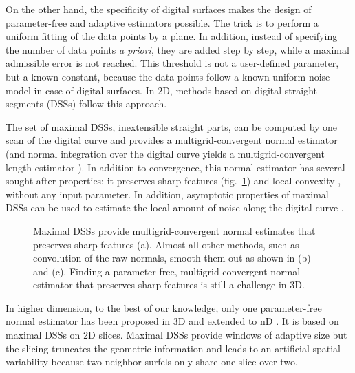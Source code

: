 On the other hand, the specificity of digital surfaces makes the design of parameter-free
and adaptive estimators possible. The trick is to perform a uniform fitting of the data points by a plane.
In addition, instead of specifying the number of data points \emph{a priori}, they are added
step by step, while a maximal admissible error is not reached. This threshold is not a user-defined
parameter, but a known constant, because the data points follow a known uniform noise model
in case of digital surfaces. In 2D, methods based on digital straight segments (DSSs) follow
this approach.

The set of maximal DSSs, \ie inextensible straight parts, can be computed by one scan of the
digital curve \cite{Feschet1999,Feschet2005} and provides a multigrid-convergent
normal estimator \cite{Lachaud2007} (and normal integration over the digital curve yields
a multigrid-convergent length estimator \cite{Coeurjolly2004}). In addition to
convergence, this normal estimator has several sought-after properties:
it preserves sharp features (fig.~\ref{fig:corner}) and local convexity \cite{Roussillon2011},
without any input parameter. 
In addition, asymptotic properties of maximal DSSs can be used to estimate the local amount
of noise along the digital curve \cite{Kerautret2012}.  
\begin{figure}[htbp]
  \centering
  \caption{Maximal DSSs provide multigrid-convergent normal estimates that preserves sharp features (a). 
    Almost all other methods, such as convolution of the raw normals, smooth them out as shown in (b) and (c).
    Finding a parameter-free, multigrid-convergent normal estimator that preserves sharp features is still a
    challenge in 3D.}
  \label{fig:corner}
\end{figure}

In higher dimension, to the best of our knowledge, only one parameter-free normal estimator
has been proposed in 3D \cite{Lenoir1996,Tellier1999} and extended to nD \cite{Lachaud2003}.
It is based on maximal DSSs on 2D slices. Maximal DSSs provide windows of adaptive size
but the slicing truncates the geometric information and leads to
an artificial spatial variability because two neighbor surfels only
share one slice over two. 

